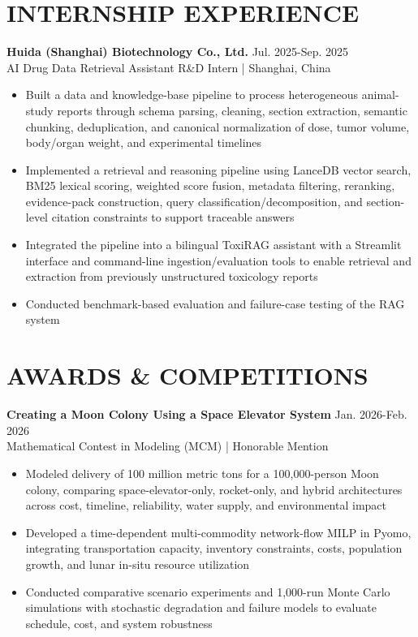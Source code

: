 \documentclass[a4paper,9pt]{extarticle}
\begin{document}
\section*{INTERNSHIP EXPERIENCE}
\noindent \textbf{Huida (Shanghai) Biotechnology Co., Ltd.} \hfill Jul. 2025-Sep. 2025\\
\noindent AI Drug Data Retrieval Assistant R\&D Intern | Shanghai, China
\begin{itemize}
    \item Built a data and knowledge-base pipeline to process heterogeneous animal-study reports through schema parsing, cleaning, section extraction, semantic chunking, deduplication, and canonical normalization of dose, tumor volume, body/organ weight, and experimental timelines
    \item Implemented a retrieval and reasoning pipeline using LanceDB vector search, BM25 lexical scoring, weighted score fusion, metadata filtering, reranking, evidence-pack construction, query classification/decomposition, and section-level citation constraints to support traceable answers
    \item Integrated the pipeline into a bilingual ToxiRAG assistant with a Streamlit interface and command-line ingestion/evaluation tools to enable retrieval and extraction from previously unstructured toxicology reports
    \item Conducted benchmark-based evaluation and failure-case testing of the RAG system
\end{itemize}

\section*{AWARDS \& COMPETITIONS}
\noindent \textbf{Creating a Moon Colony Using a Space Elevator System} \hfill Jan. 2026-Feb. 2026\\
\noindent Mathematical Contest in Modeling (MCM) | Honorable Mention
\begin{itemize}
    \item Modeled delivery of 100 million metric tons for a 100,000-person Moon colony, comparing space-elevator-only, rocket-only, and hybrid architectures across cost, timeline, reliability, water supply, and environmental impact
    \item Developed a time-dependent multi-commodity network-flow MILP in Pyomo, integrating transportation capacity, inventory constraints, costs, population growth, and lunar in-situ resource utilization
    \item Conducted comparative scenario experiments and 1,000-run Monte Carlo simulations with stochastic degradation and failure models to evaluate schedule, cost, and system robustness
\end{itemize}
\end{document}

